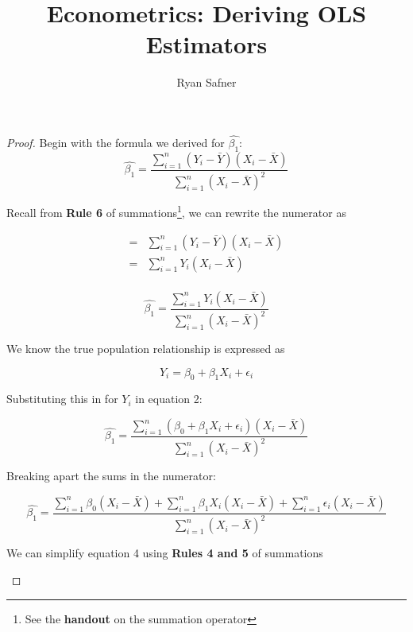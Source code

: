 \documentclass{article}
\title{Econometrics: Deriving OLS Estimators}
\author{Ryan Safner}
\date{}
\begin{document}
	\maketitle

\begin{proof}
	Begin with the formula we derived for $\hat{\beta_1}$:
\begin{equation}
\hat{\beta_1}=\frac{\displaystyle \sum^n_{i=1} (Y_i-\bar{Y})(X_i-\bar{X})}{\displaystyle\sum^n_{i=1} (X_i-\bar{X})^2}
\end{equation}

Recall from \textbf{Rule 6} of summations\footnote{See the \textbf{handout} on the summation operator}, we can rewrite the numerator as 

\begin{align*}
	=&\displaystyle \sum^n_{i=1} (Y_i-\bar{Y})(X_i-\bar{X})\\
	=& \displaystyle \sum^n_{i=1} Y_i(X_i-\bar{X})\\
\end{align*}

\begin{equation}
\hat{\beta_1}=\frac{\displaystyle \sum^n_{i=1} Y_i(X_i-\bar{X})}{\displaystyle\sum^n_{i=1} (X_i-\bar{X})^2}
\end{equation}

We know the true population relationship is expressed as 

\begin{equation*}
Y_i=\beta_0+\beta_1 X_i+\epsilon_i
\end{equation*}

Substituting this in for $Y_i$ in equation 2:

\begin{equation}
\hat{\beta_1}=\frac{\displaystyle \sum^n_{i=1} (\beta_0+\beta_1X_i+\epsilon_i)(X_i-\bar{X})}{\displaystyle\sum^n_{i=1} (X_i-\bar{X})^2}
\end{equation}

Breaking apart the sums in the numerator:

\begin{equation}
\hat{\beta_1}=\frac{\displaystyle \sum^n_{i=1} \beta_0(X_i-\bar{X})+\displaystyle \sum^n_{i=1} \beta_1X_i(X_i-\bar{X})+\displaystyle \sum^n_{i=1} \epsilon_i(X_i-\bar{X})}{\displaystyle\sum^n_{i=1} (X_i-\bar{X})^2}
\end{equation}

We can simplify equation 4 using \textbf{Rules 4 and 5} of summations

\begin{enumerate}


\end{enumerate}
\end{proof}
\end{document}
